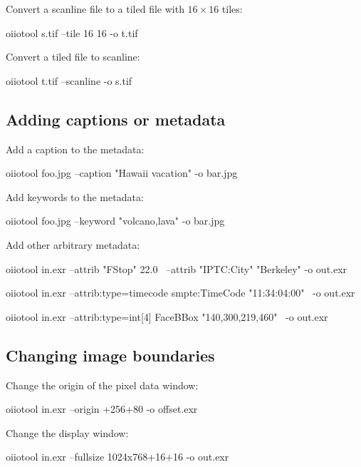 Convert a scanline file to a tiled file with $16 \times 16$ tiles:

\begin{code}
    oiiotool s.tif --tile 16 16 -o t.tif
\end{code}

\noindent Convert a tiled file to scanline:

\begin{code}
    oiiotool t.tif --scanline -o s.tif
\end{code}



\subsection*{Adding captions or metadata}

\noindent Add a caption to the metadata:
\begin{code}
    oiiotool foo.jpg --caption "Hawaii vacation" -o bar.jpg
\end{code}

\noindent Add keywords to the metadata:
\begin{code}
    oiiotool foo.jpg --keyword "volcano,lava" -o bar.jpg
\end{code}

\noindent Add other arbitrary metadata:
\begin{code}
    oiiotool in.exr --attrib "FStop" 22.0 \
            --attrib "IPTC:City" "Berkeley" -o out.exr

    oiiotool in.exr --attrib:type=timecode smpte:TimeCode "11:34:04:00" \
            -o out.exr

    oiiotool in.exr --attrib:type=int[4] FaceBBox "140,300,219,460" \
            -o out.exr
\end{code}


\subsection*{Changing image boundaries}

\noindent Change the origin of the pixel data window:
\begin{code}
    oiiotool in.exr --origin +256+80 -o offset.exr
\end{code}

\noindent Change the display window:
\begin{code}
    oiiotool in.exr --fullsize 1024x768+16+16 -o out.exr
\end{code}

